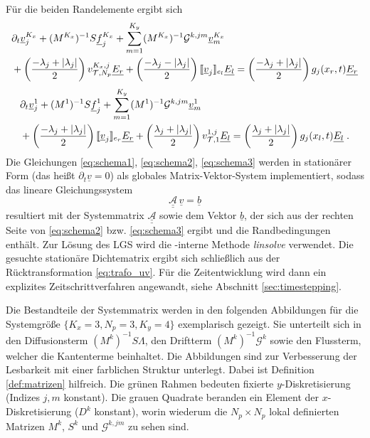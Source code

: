 Für die beiden Randelemente ergibt sich
\begin{equation}
  \begin{aligned}
      &\partial_t \underline{v}_j^{K_x} + (M^{K_x})^{-1}S \underline{f}_j^{K_x} + \sum_{m=1}^{K_y} (M^{K_x})^{-1}\mathcal{G}^{k,jm}\underline{v}_m^{K_x} \\
      &+ \left(\frac{-\lambda_j + |\lambda_j|}{2}\right) v_{\mathcal{T},N_p}^{K_x,j} \underline{E_r} +
         \left(\frac{-\lambda_j - |\lambda_j|}{2}\right) \llbracket \underline{v}_j \rrbracket_{e_l}\underline{E_l} =
         \left(\frac{-\lambda_j + |\lambda_j|}{2}\right) g_j(x_r,t)\underline{E_r}
  \end{aligned}
  \label{eq:schema2}
\end{equation}
\begin{equation}
  \begin{aligned}
      &\partial_t \underline{v}_j^{1} + (M^{1})^{-1}S \underline{f}_j^{1} + \sum_{m=1}^{K_y} (M^{1})^{-1}\mathcal{G}^{k,jm}\underline{v}_m^{1} \\
        &+ \left(\frac{-\lambda_j + |\lambda_j|}{2}\right) \llbracket \underline{v}_j \rrbracket_{e_r}\underline{E_r} +
           \left(\frac{\lambda_j + |\lambda_j|}{2}\right) v_{\mathcal{T},1}^{1,j} \underline{E_l}
        =\left(\frac{\lambda_j + |\lambda_j|}{2}\right) g_j(x_l,t)\underline{E_l} \; .
  \end{aligned}
  \label{eq:schema3}
\end{equation}
Die Gleichungen \eqref{eq:schema1}, \eqref{eq:schema2}, \eqref{eq:schema3} werden in stationärer Form (das heißt $\partial_t \underline{v}=0$) als globales Matrix-Vektor-System implementiert, sodass das lineare Gleichungssystem
\begin{equation}
  \underline{\underline{\mathcal{A}}}\,\underline{v} = \underline{b}
  \label{eq:stat_LGS}
\end{equation}
resultiert mit der Systemmatrix $\underline{\underline{\mathcal{A}}}$ sowie dem Vektor $\underline{b}$, der sich aus der rechten Seite von \eqref{eq:schema2} bzw. \eqref{eq:schema3} ergibt und die Randbedingungen enthält. Zur Lösung des LGS wird die \mat-interne Methode \emph{linsolve} verwendet. Die gesuchte stationäre Dichtematrix ergibt sich schließlich aus der Rücktransformation \eqref{eq:trafo_uv}. Für die Zeitentwicklung wird dann ein explizites Zeitschrittverfahren angewandt, siehe Abschnitt \ref{sec:timestepping}.

Die Bestandteile der Systemmatrix werden in den folgenden Abbildungen für die Systemgröße $\{K_x=3, N_p=3, K_y=4\}$ exemplarisch gezeigt. Sie unterteilt sich in den Diffusionsterm $(M^k)^{-1}S\Lambda$, den Driftterm $(M^k)^{-1}\mathcal{G}^k$ sowie den Flussterm, welcher die Kantenterme beinhaltet. Die Abbildungen sind zur Verbesserung der Lesbarkeit mit einer farblichen Struktur unterlegt. Dabei ist Definition \ref{def:matrizen} hilfreich. Die grünen Rahmen bedeuten fixierte $y$-Diskretisierung (Indizes $j,m$ konstant). Die grauen Quadrate beranden ein Element der $x$-Diskretisierung ($D^k$ konstant), worin wiederum die $N_p \times N_p$ lokal definierten Matrizen $M^k$, $S^k$ und $\mathcal{G}^{k,jm}$ zu sehen sind.

